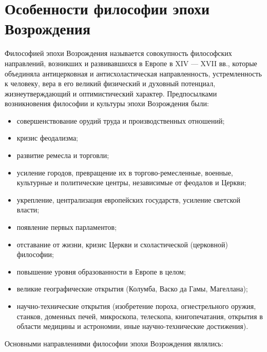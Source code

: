 \documentclass[12pt]{article}
\begin{document}
\section{Особенности философии эпохи Возрождения}
  Философией  эпохи  Возрождения  называется  совокупность  философских  направлений,  возникших  и
развивавшихся  в  Европе  в  XIV  —  XVII  вв.,  которые  объединяла  антицерковная  и  антисхоластическая
направленность,  устремленность  к  человеку,  вера  в  его  великий  физический  и  духовный  потенциал,
жизнеутверждающий и оптимистический характер.
Предпосылками возникновения философии и культуры эпохи Возрождения были:
\begin{itemize}
  \item совершенствование орудий труда и производственных отношений;
  \item кризис феодализма;
  \item развитие ремесла и торговли;
  \item усиление городов, превращение их в торгово-ремесленные, военные, культурные и политические центры,
независимые от феодалов и Церкви;
\item укрепление, централизация европейских государств, усиление светской власти;
\item появление первых парламентов;
\item отставание от жизни, кризис Церкви и схоластической (церковной) философии;
\item повышение уровня образованности в Европе в целом;
\item великие географические открытия (Колумба, Васко да Гамы, Магеллана);
\item  научно-технические  открытия  (изобретение  пороха,  огнестрельного  оружия,  станков,  доменных  печей,
микроскопа, телескопа, книгопечатания, открытия в области медицины и астрономии, иные научно-технические
достижения).
\end{itemize}
Основными направлениями философии эпохи Возрождения являлись:
\end{document}
